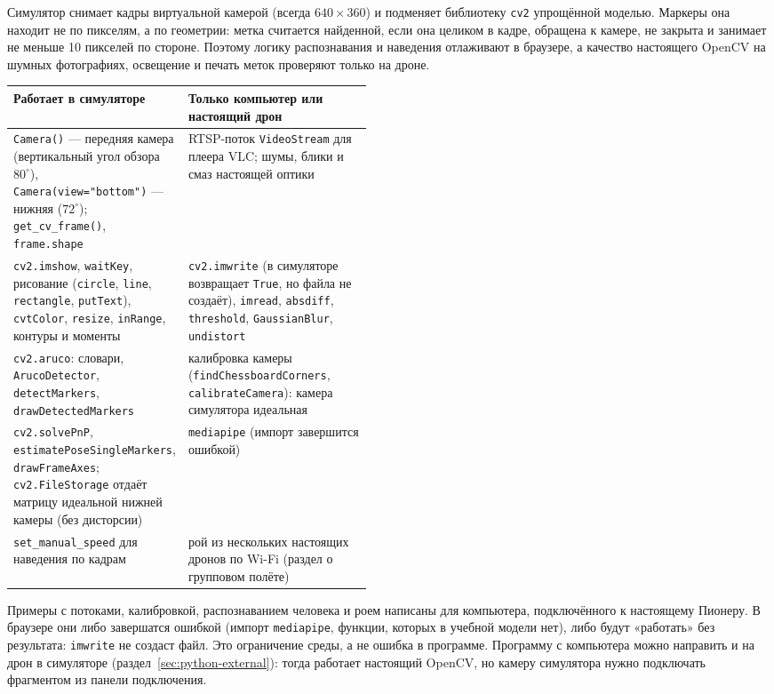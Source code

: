 Симулятор снимает кадры виртуальной камерой (всегда $640\times360$) и подменяет библиотеку \texttt{cv2} упрощённой моделью. Маркеры она находит не по пикселям, а по геометрии: метка считается найденной, если она целиком в кадре, обращена к камере, не закрыта и занимает не меньше 10 пикселей по стороне. Поэтому логику распознавания и наведения отлаживают в браузере, а качество настоящего OpenCV на шумных фотографиях, освещение и печать меток проверяют только на дроне.

\begin{center}
\small
\begin{tabularx}{\linewidth}{@{}>{\raggedright\arraybackslash}p{0.47\linewidth} >{\raggedright\arraybackslash}X@{}}
\toprule
\textbf{Работает в симуляторе} & \textbf{Только компьютер или настоящий дрон} \\
\midrule
\texttt{Camera()} --- передняя камера (вертикальный угол обзора $80^\circ$), \texttt{Camera(view="bottom")} --- нижняя ($72^\circ$); \texttt{get\_cv\_frame()}, \texttt{frame.shape} & RTSP-поток \texttt{VideoStream} для плеера VLC; шумы, блики и смаз настоящей оптики \\
\texttt{cv2.imshow}, \texttt{waitKey}, рисование (\texttt{circle}, \texttt{line}, \texttt{rectangle}, \texttt{putText}), \texttt{cvtColor}, \texttt{resize}, \texttt{inRange}, контуры и моменты & \texttt{cv2.imwrite} (в симуляторе возвращает \texttt{True}, но файла не создаёт), \texttt{imread}, \texttt{absdiff}, \texttt{threshold}, \texttt{GaussianBlur}, \texttt{undistort} \\
\texttt{cv2.aruco}: словари, \texttt{ArucoDetector}, \texttt{detectMarkers}, \texttt{drawDetectedMarkers} & калибровка камеры (\texttt{findChessboardCorners}, \texttt{calibrateCamera}): камера симулятора идеальная \\
\texttt{cv2.solvePnP}, \texttt{estimatePoseSingleMarkers}, \texttt{drawFrameAxes}; \texttt{cv2.FileStorage} отдаёт матрицу идеальной нижней камеры (без дисторсии) & \texttt{mediapipe} (импорт завершится ошибкой) \\
\texttt{set\_manual\_speed} для наведения по кадрам & рой из нескольких настоящих дронов по Wi-Fi (раздел о групповом полёте) \\
\bottomrule
\end{tabularx}
\end{center}

\begin{warnbox}
Примеры с потоками, калибровкой, распознаванием человека и роем написаны для компьютера, подключённого к настоящему Пионеру. В браузере они либо завершатся ошибкой (импорт \texttt{mediapipe}, функции, которых в учебной модели нет), либо будут «работать» без результата: \verb|imwrite| не создаст файл. Это ограничение среды, а не ошибка в программе. Программу с компьютера можно направить и на дрон в симуляторе (раздел~\ref{sec:python-external}): тогда работает настоящий OpenCV, но камеру симулятора нужно подключать фрагментом из панели подключения.
\end{warnbox}

